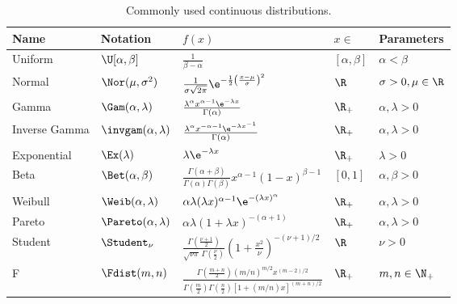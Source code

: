 \begin{table}[H]
	\centering
	\caption{Commonly used continuous distributions.}
	\label{tab:ContinuousDistributions}
	\renewcommand{\arraystretch}{1.5}
	\begin{tabular}{@{}lllll@{}}
		\toprule
		Name          & Notation                   & \(f(x)\)                                                                                                                & \(x \in\)           & Parameters               \\
		\midrule
		Uniform       & \(\U[\alpha, \beta]\)        & \(\frac{1}{\beta - \alpha}\)                                                                                            & \([\alpha, \beta]\) & \(\alpha < \beta\)         \\
		Normal        & \(\Nor(\mu, \sigma^2)\)      & \(\frac{1}{\sigma \sqrt{2\pi}} \e^{-\frac{1}{2}\left(\frac{x-\mu}{\sigma}\right)^2}\)                                   & \(\R\)              & \(\sigma > 0, \mu \in \R\) \\
		Gamma         & \(\Gam(\alpha, \lambda)\)    & \(\frac{\lambda^\alpha x^{\alpha-1} \e^{-\lambda x}}{\Gamma(\alpha)}\)                                                  & \(\R_+\)            & \(\alpha, \lambda > 0\)    \\
		Inverse Gamma & \(\invgam(\alpha, \lambda)\) & \(\frac{\lambda^\alpha x^{-\alpha-1} \e^{-\lambda x^{-1}}}{\Gamma(\alpha)}\)                                            & \(\R_+\)            & \(\alpha, \lambda > 0\)    \\
		Exponential   & \(\Ex(\lambda)\)             & \(\lambda \e^{-\lambda x}\)                                                                                             & \(\R_+\)            & \(\lambda > 0\)            \\
		Beta          & \(\Bet(\alpha, \beta)\)      & \(\frac{\Gamma(\alpha + \beta)}{\Gamma(\alpha)\Gamma(\beta)} x^{\alpha-1} (1-x)^{\beta-1}\)                             & \([0, 1]\)          & \(\alpha, \beta > 0\)      \\
		Weibull       & \(\Weib(\alpha, \lambda)\)   & \(\alpha\lambda(\lambda x)^{\alpha-1}\e^{-(\lambda x)^\alpha}\)                                                         & \(\R_+\)            & \(\alpha, \lambda > 0\)    \\
		Pareto        & \(\Pareto(\alpha, \lambda)\) & \(\alpha\lambda(1 + \lambda x)^{-(\alpha+1)}\)                                                                          & \(\R_+\)            & \(\alpha, \lambda > 0\)    \\
		Student       & \(\Student_\nu\)             & \(\frac{\Gamma(\frac{\nu+1}{2})}{\sqrt{\nu\pi}\,\Gamma(\frac{\nu}{2})} \left(1 + \frac{x^2}{\nu}\right)^{-(\nu+1)/2}\)  & \(\R\)              & \(\nu > 0\)                \\
		F             & \(\Fdist(m, n)\)             & \(\frac{\Gamma(\frac{m+n}{2}) (m/n)^{m/2} x^{(m-2)/2}}{\Gamma(\frac{m}{2})\Gamma(\frac{n}{2}) [1 + (m/n)x]^{(m+n)/2}}\) & \(\R_+\)            & \(m, n \in \N_+\)          \\
		\bottomrule
	\end{tabular}
\end{table}

